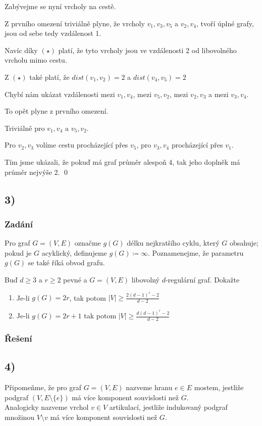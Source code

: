 \documentclass[../main.tex]{subfiles}
\begin{document}
Zabývejme se nyní vrcholy na cestě.

Z prvního omezení triviálně plyne, že vrcholy $v_1, v_3, v_5$  a $v_2, v_4$,
tvoří úplné grafy, jsou od sebe tedy vzdálenost 1. 

Navíc díky $(\star)$ platí, že tyto
vrcholy jsou ve vzdálenosti 2 od libovolného vrcholu mimo cestu. 

Z $(\star)$ také platí, že $dist(v_1,v_2) = 2$ a $dist(v_4,v_5) = 2$

Chybí nám ukázat vzdálenosti mezi $v_1, v_4$, mezi $v_5, v_2$, mezi $v_2, v_3$ a mezi $v_3, v_4$.

To opět plyne z prvního omezení.

Triviálně pro $v_1, v_4$ a $v_5, v_2$.

Pro $v_2, v_3$ volíme cestu procházející přes $v_5$, pro $v_3, v_4$ procházející přes $v_1$.

Tím jsme ukázali, že pokuď má graf průměr alespoň 4, tak jeho doplněk má průměr nejvýše 2.
\qed




\subsection{3)}
\subsubsection*{Zadání}
Pro graf $G=(V,E)$ označme $g(G)$ délku nejkratšího cyklu, který $G$ obsahuje; pokud je $G$ acyklický, definujeme $g(G)\coloneq \infty$.
Poznamenejme, že parametru $g(G)$ se také říká obvod grafu.

Buď $d\geq 3$ a $r\geq 2$ pevné a $G=(V,E)$ libovolný $d$-regulární graf. Dokažte
\begin{enumerate}
    \item Je-li $g(G)=2r$, tak  potom $|V| \geq \frac{2(d-1)^r -2}{d-2}$
    \item Je-li $g(G) = 2r + 1$ tak potom $|V|\geq \frac{d(d-1)^r -2}{d-2}$
\end{enumerate}

\subsubsection*{Řešení}


\subsection{4)}
Připomeňme, že pro graf $G=(V,E)$ nazveme hranu $e\in E$ mostem, jestliže podgraf $(V,E\setminus\{e\})$ má více komponent souvislosti než $G$.\\
Analogicky nazveme vrchol $v\in V$ artikulací, jestliže indukovaný podgraf množinou $V\setminus{v}$ má více komponent souvislosti než $G$.
\end{document}
